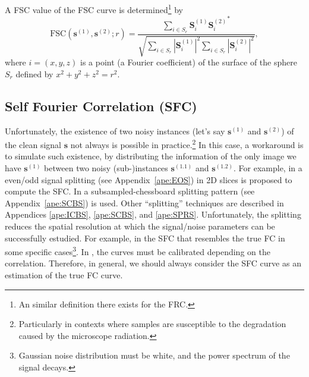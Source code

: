 \documentclass{article}
\begin{document}

A FSC value of the FSC curve is determined\footnote{An similar
  definition there exists for the FRC.} by~\cite{verbeke2024self}
\begin{equation}
\text{FSC}(\mathbf{s}^{(1)}, \mathbf{s}^{(2)}; r) = \frac{\sum_{i \in S_r} \mathbf{S}^{(1)}_i {\mathbf{S}^{(2)}_i}^*}{\sqrt{\sum_{i \in S_r} |\mathbf{S}^{(1)}_i|^2 \sum_{i \in S_r} |\mathbf{S}^{(2)}_i|^2}},
\end{equation}
where $i=(x, y, z)$ is a point (a Fourier coefficient) of the surface
of the sphere $S_r$ defined by $x^2+y^2+z^2=r^2$.

\subsection{Self Fourier Correlation (SFC)}

Unfortunately, the existence of two noisy instances (let's say
$\mathbf{s}^{(1)}$ and $\mathbf{s}^{(2)}$) of the clean signal
$\mathbf{s}$ not always is possible in practice.\footnote{Particularly
  in contexts where samples are susceptible to the degradation caused
  by the microscope radiation.} In this case, a workaround is to
simulate such existence, by distributing the information of the only
image we have $\mathbf{s}^{(1)}$ between two noisy (sub-)instances
$\mathbf{s}^{(1.1)}$ and $\mathbf{s}^{(1.2)}$. For example, in
\cite{verbeke2024self} a even/odd signal splitting (see
Appendix~\ref{ape:EOS}) in 2D slices is proposed to compute the
SFC. In \cite{koho2019fourier} a subsampled-chessboard splitting
pattern (see Appendix~\ref{ape:SCBS}) is used. Other ``splitting''
techniques are described in Appendices \ref{ape:ICBS}, \ref{ape:SCBS},
and \ref{ape:SPRS}. Unfortunately, the splitting reduces the spatial
resolution at which the signal/noise parameters can be successfully
estudied. For example, in \cite{verbeke2024self} the SFC that
resembles the true FC in some specific cases\footnote{Gaussian noise
  distribution must be white, and the power spectrum of the signal
  decays.}. In \cite{koho2019fourier}, the curves must be calibrated
depending on the correlation. Therefore, in general, we should always
consider the SFC curve as an estimation of the true FC curve.
\end{document}
